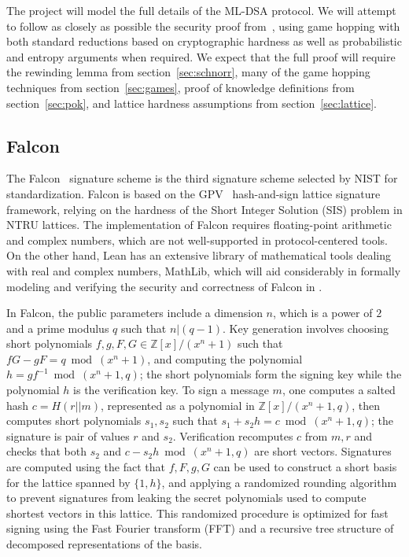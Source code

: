 The project will model the full details of the ML-DSA protocol.  
We will attempt to follow as closely as possible the security proof from~\cite{dilithium3}, using game hopping with both standard reductions based on cryptographic hardness as well as probabilistic and entropy arguments when required. 
We expect that the full proof will require the rewinding lemma from section~\ref{sec:schnorr}, many of the game hopping techniques from section~\ref{sec:games}, proof of knowledge definitions from section~\ref{sec:pok}, and lattice hardness assumptions from section~\ref{sec:lattice}.


\subsection{Falcon}\label{sec:falcon}

The Falcon~\cite{fouque2018falcon} signature scheme is the third signature scheme selected by NIST for standardization.  
Falcon is based on the GPV~\cite{GPV} hash-and-sign lattice signature framework, relying on the hardness of the Short Integer Solution (SIS) problem in NTRU lattices.
The implementation of Falcon requires floating-point arithmetic and complex numbers, which are not well-supported in protocol-centered tools.
On the other hand, Lean has an extensive library of mathematical tools dealing with real and complex numbers,  MathLib, which will aid considerably in formally modeling and verifying the security and correctness of Falcon in \vcvio.

In Falcon, the public parameters include a dimension $n$, which is a power of $2$ and a prime modulus $q$ such that $n | (q-1)$.  Key generation involves choosing short polynomials $f,g,F,G \in \mathbb{Z}[x]/(x^n+1)$ such that $fG-gF = q \bmod (x^n+1)$, and computing the polynomial $h=gf^{-1} \bmod (x^n+1,q)$; the short polynomials form the signing key while the polynomial $h$ is the verification key.
To sign a message $m$, one computes a salted hash $c = H(r||m)$, represented as a polynomial in $\mathbb{Z}[x]/(x^n+1,q)$, then computes short polynomials $s_1,s_2$ such that $s_1 + s_2h = c \bmod (x^n+1,q)$; the signature is pair of values $r$ and $s_2$.
Verification recomputes $c$ from $m,r$ and checks that both $s_2$ and $c-s_2h \bmod (x^n+1,q)$ are short vectors.
Signatures are computed using the fact that $f,F,g,G$ can be used to construct a short basis for the lattice spanned by $\{1,h\}$, and applying a randomized rounding algorithm to prevent signatures from leaking the secret polynomials used to compute shortest vectors in this lattice.
This randomized procedure is optimized for fast signing using the Fast Fourier transform (FFT) and a recursive tree structure of decomposed representations of the basis.

